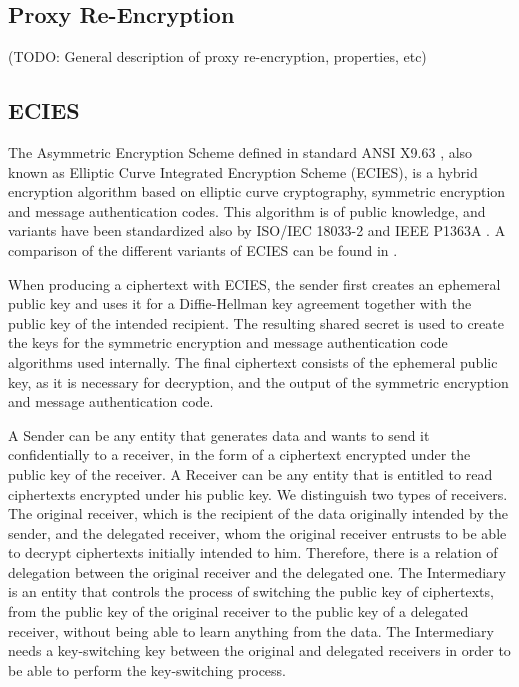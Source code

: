 \documentclass[12pt]{article}
\begin{document}
\subsection{Proxy Re-Encryption}

(TODO: General description of proxy re-encryption, properties, etc)

\subsection{ECIES}

The Asymmetric Encryption Scheme defined in standard ANSI X9.63 \cite{ansi-x9.63}, also known as Elliptic Curve Integrated Encryption Scheme (ECIES), is a hybrid encryption algorithm based on elliptic curve cryptography, symmetric encryption and message authentication codes. 
This algorithm is of public knowledge, and variants have been standardized also by ISO/IEC 18033-2 \cite{iso-18033-2} and IEEE P1363A \cite{ieee-p1363a}. A comparison of the different variants of ECIES can be found in \cite{gayoso2015security}. 

When producing a ciphertext with ECIES, the sender first creates an ephemeral public key and uses it for a Diffie-Hellman key agreement together with the public key of the intended recipient. The resulting shared secret is used to create the keys for the symmetric encryption and message authentication code algorithms used internally. The final ciphertext consists of the ephemeral public key, as it is necessary for decryption, and the output of the symmetric encryption and message authentication code.

A Sender can  be any entity that generates data and wants to send it confidentially to a receiver, in the form of a ciphertext encrypted under the public key of the receiver. 
%
A Receiver can be any entity that is entitled to read ciphertexts encrypted under his public key. We distinguish two types of receivers. The original receiver, which is the recipient of the data originally intended by the sender, and the delegated receiver, whom the original receiver entrusts to be able to decrypt ciphertexts initially intended to him. Therefore, there is a relation of delegation between the original receiver and the delegated one. 
% 
The Intermediary is an entity that controls the process of switching the public key of ciphertexts, from the public key of the original receiver to the public key of a delegated receiver, without being able to learn anything from the data. The Intermediary needs a key-switching key between the original and delegated receivers in order to be able to perform the key-switching process.
\end{document}
